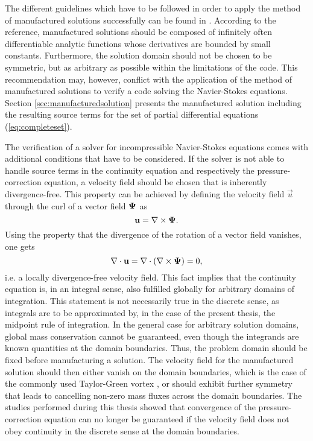 The different guidelines which have to be followed in order to apply the method of manufactured solutions successfully can be found in \cite{salari00}. According to the reference, manufactured solutions should be composed of infinitely often differentiable analytic functions whose derivatives are bounded by small constants. Furthermore, the solution domain should not be chosen to be symmetric, but as arbitrary as possible within the limitations of the code. This recommendation may, however, conflict with the application of the method of manufactured solutions to verify a code solving the Navier-Stokes equations. Section \ref{sec:manufacturedsolution} presents the manufactured solution including the resulting source terms for the set of partial differential equations (\ref{eq:completeset}).

The verification of a solver for incompressible Navier-Stokes equations comes with additional conditions that have to be considered. If the solver is not able to handle source terms in the continuity equation and respectively the pressure-correction equation, a velocity field should be chosen that is inherently divergence-free. This property can be achieved by defining the velocity field \(\vec{u}\) through the curl of a vector field \(\boldsymbol{\Psi}\) as
\begin{displaymath}
  \mathbf{u} = \nabla \times \boldsymbol{\Psi}.
\end{displaymath}
Using the property that the divergence of the rotation of a vector field vanishes, one gets
\begin{displaymath}
  \nabla \cdot \mathbf{u} = \nabla \cdot \left( \nabla \times \boldsymbol{\Psi}\right) = 0,
\end{displaymath}
i.e. a locally divergence-free velocity field. This fact implies that the continuity equation is, in an integral sense, also fulfilled globally for arbitrary domains of integration. This statement is not necessarily true in the discrete sense, as integrals are to be approximated by, in the case of the present thesis, the midpoint rule of integration. In the general case for arbitrary solution domains, global mass conservation cannot be guaranteed, even though the integrands are known quantities at the domain boundaries. Thus, the problem domain should be fixed before manufacturing a solution. The velocity field for the manufactured solution should then either vanish on the domain boundaries, which is the case of the commonly used Taylor-Green vortex \cite{taylor37}, or should exhibit further symmetry that leads to cancelling non-zero mass fluxes across the domain boundaries. The studies performed during this thesis showed that convergence of the pressure-correction equation can no longer be guaranteed if the velocity field does not obey continuity in the discrete sense at the domain boundaries.

